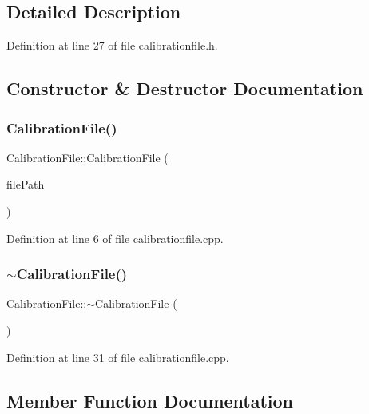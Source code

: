 \subsection{Detailed Description}


Definition at line 27 of file calibrationfile.\+h.



\subsection{Constructor \& Destructor Documentation}
\mbox{\label{class_calibration_file_a349ad2ceece7060f0c98dd4f9a95fd5a}} 
\subsubsection{\texorpdfstring{CalibrationFile()}{CalibrationFile()}}
{\footnotesize\ttfamily Calibration\+File\+::\+Calibration\+File (\begin{DoxyParamCaption}\item[{Q\+String}]{file\+Path }\end{DoxyParamCaption})}



Definition at line 6 of file calibrationfile.\+cpp.

\mbox{\label{class_calibration_file_a136f431f543f20bf2b015c85ad7d0017}} 
\subsubsection{\texorpdfstring{$\sim$CalibrationFile()}{~CalibrationFile()}}
{\footnotesize\ttfamily Calibration\+File\+::$\sim$\+Calibration\+File (\begin{DoxyParamCaption}{ }\end{DoxyParamCaption})}



Definition at line 31 of file calibrationfile.\+cpp.



\subsection{Member Function Documentation}
\mbox{\label{class_calibration_file_a061c91faf45b5d26d920e789b6208867}} 
